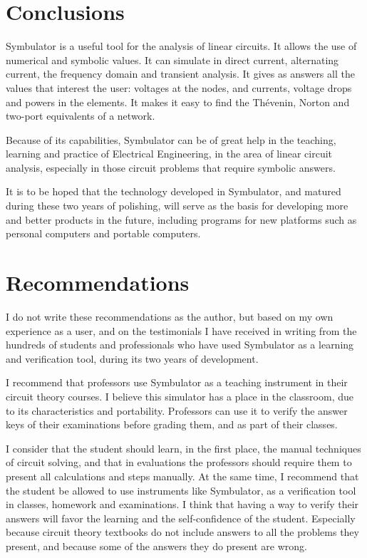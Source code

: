 
\chapter*{Conclusions}

Symbulator is a useful tool for the analysis of linear circuits. It
allows the use of numerical and symbolic values. It can simulate in
direct current, alternating current, the frequency domain and
transient analysis. It gives as answers all the values that interest
the user: voltages at the nodes, and currents, voltage drops and
powers in the elements. It makes it easy to find the Th\'evenin,
Norton and two-port equivalents of a network.

Because of its capabilities, Symbulator can be of great help in the
teaching, learning and practice of Electrical Engineering, in the
area of linear circuit analysis, especially in those circuit
problems that require symbolic answers.

It is to be hoped that the technology developed in Symbulator, and
matured during these two years of polishing, will serve as the basis
for developing more and better products in the future, including
programs for new platforms such as personal computers and portable
computers.

\chapter*{Recommendations}

I do not write these recommendations as the author, but based on my
own experience as a user, and on the testimonials I have received in
writing from the hundreds of students and professionals who have
used Symbulator as a learning and verification tool, during its two
years of development.

I recommend that professors use Symbulator as a teaching instrument
in their circuit theory courses. I believe this simulator has a
place in the classroom, due to its characteristics and portability.
Professors can use it to verify the answer keys of their
examinations before grading them, and as part of their classes.

I consider that the student should learn, in the first place, the
manual techniques of circuit solving, and that in evaluations the
professors should require them to present all calculations and steps
manually. At the same time, I recommend that the student be allowed
to use instruments like Symbulator, as a verification tool in
classes, homework and examinations. I think that having a way to
verify their answers will favor the learning and the self-confidence
of the student. Especially because circuit theory textbooks do not
include answers to all the problems they present, and because some
of the answers they do present are wrong.

